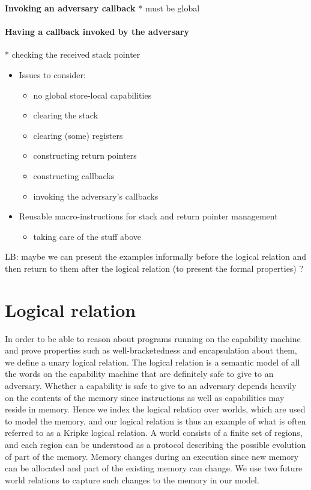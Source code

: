 \documentclass[compsoc,conference,letterpaper,fleqn]{IEEEtran}
\begin{document}
\textbf{Invoking an adversary callback}
* must be global

\paragraph{Having a callback invoked by the adversary}
* checking the received stack pointer




\begin{itemize}
\item Issues to consider:
\begin{itemize}
\item no global store-local capabilities
\item clearing the stack
\item clearing (some) registers
\item constructing return pointers
\item constructing callbacks
\item invoking the adversary's callbacks
\end{itemize}
\item Reusable macro-instructions for stack and return pointer management
\begin{itemize}
\item taking care of the stuff above
\end{itemize}
\end{itemize}

LB: maybe we can present the examples informally before the logical relation and then return to them after the logical relation (to present the formal properties) ?

\section{Logical relation}
In order to be able to reason about programs running on the capability
machine and prove properties such as well-bracketedness and
encapsulation about them, we define a unary logical relation.
The logical relation is a semantic model of all the words on the
capability machine that are definitely safe to give to an
adversary. Whether a capability is safe to give to an adversary
depends heavily on the contents of the memory since instructions as well
as capabilities may reside in memory. Hence we index the logical
relation over worlds, which are used to model the memory, and our logical
relation is thus an example of what is often referred to as a Kripke
logical relation. A world consists of a finite set of regions, and each region
can be understood as a protocol describing the possible evolution of
part of the memory. Memory changes during an
execution since new memory can be allocated and part of the existing
memory can change. We use two future world relations to capture
such changes to the memory in our model.
%
\end{document}
